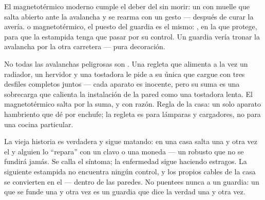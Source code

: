 \begin{example}\label{ex:g7:short-circuits-safety:breaker}
El magnetotérmico moderno cumple el deber del  sin morir: un
 con muelle que salta abierto ante la avalancha y se
rearma con un gesto --- después de curar la avería.  o
magnetotérmico, el puesto del guardia es el mismo: \emph{}, en la  que protege, para que la estampida tenga que
pasar por su control. Un guardia  vería tronar la
avalancha por la otra carretera --- pura decoración.
\end{example}

\begin{example}\label{ex:g7:short-circuits-safety:overload}
No todas las avalanchas peligrosas son . Una regleta
que alimenta a la vez un radiador, un hervidor y una tostadora le pide
a su única  que cargue con tres desfiles completos juntos ---
cada aparato es inocente, pero su suma es una sobrecarga que calienta
la instalación de la pared como una tostadora lenta. El
magnetotérmico salta por la suma, y con razón. Regla de la casa: un
solo aparato hambriento que dé  por enchufe; la regleta es para
lámparas y cargadores, no para una cocina particular.
\end{example}

\begin{remark}\label{rem:g7:short-circuits-safety:nail}
La vieja historia es verdadera y sigue matando: en una casa salta una
y otra vez el  y alguien lo ``repara'' con un clavo o una
moneda --- un  robusto que no se fundirá jamás. Se calla
el síntoma; la enfermedad sigue haciendo estragos. La siguiente
estampida no encuentra ningún control, y los propios cables de la casa
se convierten en el  --- dentro de las paredes. No puentees
nunca a un guardia: un  que se funde una y otra vez es un
guardia que dice la verdad una y otra vez.
\end{remark}


